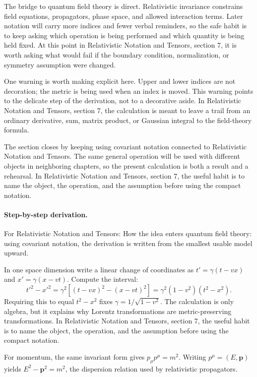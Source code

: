 The bridge to quantum field theory is direct.  Relativistic invariance constrains field equations, propagators, phase space, and allowed interaction terms.  Later notation will carry more indices and fewer verbal reminders, so the safe habit is to keep asking which operation is being performed and which quantity is being held fixed.  At this point in Relativistic Notation and Tensors, section 7, it is worth asking what would fail if the boundary condition, normalization, or symmetry assumption were changed.

One warning is worth making explicit here.  Upper and lower indices are not decoration; the metric is being used when an index is moved.  This warning points to the delicate step of the derivation, not to a decorative aside.  In Relativistic Notation and Tensors, section 7, the calculation is meant to leave a trail from an ordinary derivative, sum, matrix product, or Gaussian integral to the field-theory formula.

The section closes by keeping using covariant notation connected to Relativistic Notation and Tensors.  The same general operation will be used with different objects in neighboring chapters, so the present calculation is both a result and a rehearsal.  In Relativistic Notation and Tensors, section 7, the useful habit is to name the object, the operation, and the assumption before using the compact notation.



\paragraph{Step-by-step derivation.}

For Relativistic Notation and Tensors: How the idea enters quantum field theory: using covariant notation, the derivation is written from the smallest usable model upward.

In one space dimension write a linear change of coordinates as \(t'=\gamma(t-vx)\) and \(x'=\gamma(x-vt)\).  Compute the interval:
\[
  t'^2-x'^2
  =
  \gamma^2[(t-vx)^2-(x-vt)^2]
  =
  \gamma^2(1-v^2)(t^2-x^2).
\]
Requiring this to equal \(t^2-x^2\) fixes \(\gamma=1/\sqrt{1-v^2}\).  The calculation is only algebra, but it explains why Lorentz transformations are metric-preserving transformations.  In Relativistic Notation and Tensors, section 7, the useful habit is to name the object, the operation, and the assumption before using the compact notation.

For momentum, the same invariant form gives \(p_\mu p^\mu=m^2\).  Writing \(p^\mu=(E,\bm p)\) yields \(E^2-\bm p^2=m^2\), the dispersion relation used by relativistic propagators.

